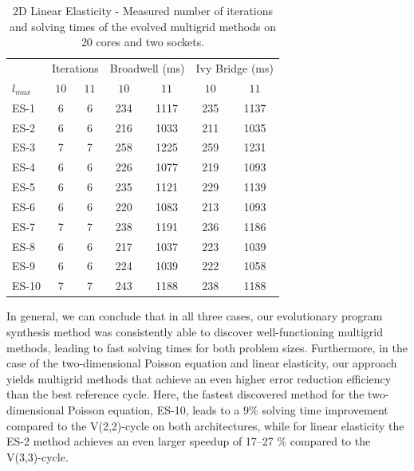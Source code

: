 \begin{table}
	\caption{2D Linear Elasticity - Measured number of iterations and solving times of the evolved multigrid methods on 20 cores and two sockets.}
	\label{table:linear-elasticity-2D-evolved-methods}
	\centering
	\begin{tabular}{l c c c c c c}
		\toprule
		& \multicolumn{2}{c}{Iterations} & \multicolumn{2}{c}{Broadwell (ms)} & \multicolumn{2}{c}{Ivy Bridge (ms)} \\
		\cmidrule(r){2-3} \cmidrule(r){4-5} \cmidrule(r){6-7}
		$l_{max}$ & $10$& $11$ & $10$ & $11$ & $10$ & $11$\\
		\midrule
		ES-1 & 6 & 6 & 234 & 1117 & 235 & 1137 \\
		\midrule
		ES-2 & 6 & 6 & 216 & 1033 & 211 & 1035 \\
		\midrule
		ES-3 & 7 & 7 & 258 & 1225 & 259 & 1231 \\
		\midrule
		ES-4 & 6 & 6 & 226 & 1077 & 219 & 1093 \\
		\midrule
		ES-5 & 6 & 6 & 235 & 1121 & 229 & 1139 \\
		\midrule
		ES-6 & 6 & 6 & 220 & 1083 & 213 & 1093 \\
		\midrule
		ES-7 & 7 & 7 & 238 & 1191 & 236 & 1186 \\
		\midrule
		ES-8 & 6 & 6 & 217 & 1037 & 223 & 1039 \\
		\midrule
		ES-9 & 6 & 6 & 224 & 1039 & 222 & 1058 \\
		\midrule
		ES-10 & 7 & 7 & 243 & 1188 & 238 & 1188 \\
		\bottomrule
	\end{tabular}
\end{table}
In general, we can conclude that in all three cases, our evolutionary program synthesis method was consistently able to discover well-functioning multigrid methods, leading to fast solving times for both problem sizes.
Furthermore, in the case of the two-dimensional Poisson equation and linear elasticity, our approach yields multigrid methods that achieve an even higher error reduction efficiency than the best reference cycle.
Here, the fastest discovered method for the two-dimensional Poisson equation, ES-10, leads to a $9 \%$ solving time improvement compared to the V(2,2)-cycle on both architectures, while for linear elasticity the ES-2 method achieves an even larger speedup of 17--27 \% compared to the V(3,3)-cycle.
